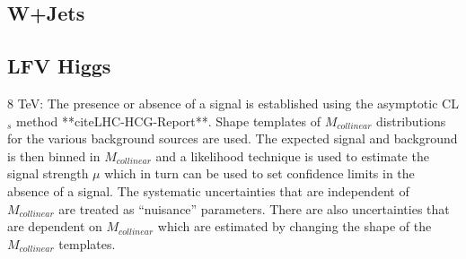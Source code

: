 \documentclass[oneside, letterpaper, oldfontcommands]{memoir}
\begin{document}
{{{\subsection{W+Jets}
\subsection{LFV Higgs}
8 TeV:
The presence or absence of a signal is established using the asymptotic CL$_{s}$ method **cite{LHC-HCG-Report}**. Shape templates of $M_{collinear}$  
distributions for the various background sources are used. The expected signal and background
is then binned in $M_{collinear}$ and a likelihood technique is used to estimate the signal strength $\mu$ which in turn can be used to
set confidence limits in the absence of a signal.
The systematic uncertainties that are independent of $M_{collinear}$ are treated as  ``nuisance''
parameters. There are also uncertainties that are dependent on $M_{collinear}$ which are estimated by changing the shape of the $M_{collinear}$ templates.



}}}
\end{document}
